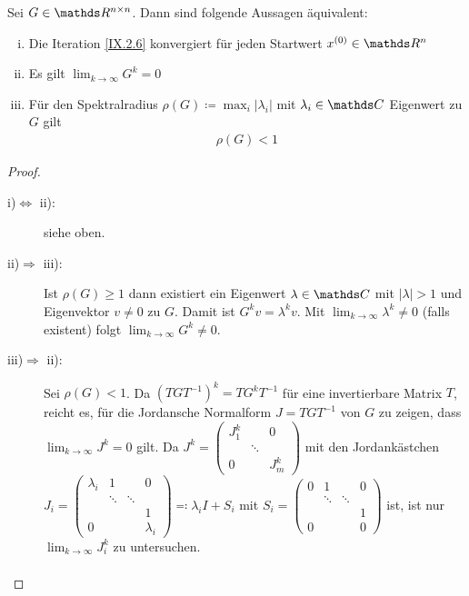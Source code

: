 \begin{Satze}[Konvergenzkriterien]\label{9.2.1}
  Sei $G\in\R^{n\times n}$.
Dann sind folgende Aussagen äquivalent:
\begin{enumerate}[i)]
\item Die Iteration \eqref{IX.2.6} konvergiert für jeden Startwert
  $x^{(0)}\in\R^n$
\item Es gilt $\lim_{k\to\infty}G^k = 0$
\item Für den Spektralradius 
  $\rho(G) \coloneqq \max_i|\lambda_i|$ 
  mit $\lambda_i\in\C$ Eigenwert zu $G$ gilt
  \begin{gather}
    \rho(G) < 1
    \label{IX.2.8}
  \end{gather}
\end{enumerate}

\begin{proof}
  \begin{description}
  \item[i)$\Leftrightarrow$ ii):] siehe oben.
  \item[ii)$\Rightarrow$ iii):]  Ist $\rho(G)\geq 1$ dann 
existiert ein Eigenwert $\lambda\in\C$ mit $|\lambda|>1$ und
Eigenvektor $v\neq 0$ zu $G$.
Damit ist $G^kv=\lambda^kv$. 
Mit $\lim_{k\to\infty}\lambda^k\neq 0$ (falls existent) folgt
$\lim_{k\to\infty}G^k \neq 0$.
\item[iii)$\Rightarrow$ ii):] Sei $\rho(G)<1$.
  Da $\left(TGT^{-1}\right)^k = TG^kT^{-1}$
 für eine invertierbare Matrix $T$, reicht es,
für die Jordansche Normalform $J=TGT^{-1}$ von $G$ zu zeigen,
dass $\lim_{k\to\infty}J^k=0$ gilt.
Da $ J^k =
\begin{pmatrix}
  J_1^k && 0 \\
  &\ddots \\
  0&& J_m^k
\end{pmatrix}$ mit den Jordankästchen
$J_i =
\begin{pmatrix}
  \lambda_i & 1 && 0\\
  &\ddots&\ddots\\
  &&&1\\
  0&&&\lambda_i
\end{pmatrix} \eqqcolon \lambda_iI+S_i$
mit $S_i =
\begin{pmatrix}
  0&1&&0 \\
  &\ddots&\ddots\\
  &&&1\\
  0&&&0
\end{pmatrix}$ ist, ist nur $\lim_{k\to\infty}J_i^k$ zu untersuchen.
\begin{align*}

\end{align*}
\end{description}
\end{proof}
\end{Satze}
